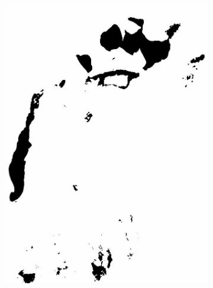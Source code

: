 \documentclass[12pt,a4paper]{article}
\begin{document}
\begin{figure}
\begin{subfigure}[b]{0.19\textwidth}
        \includegraphics[width=\textwidth]{../img/2021w.jpg}
    \end{subfigure}
    \caption{}
    \label{fig:appendixprocessed}
\end{figure}

\printbibliography
\end{document}
